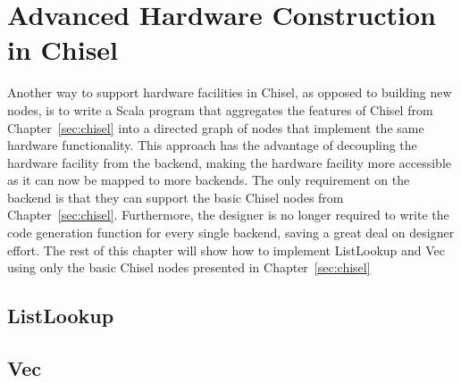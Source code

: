 \section{Advanced Hardware Construction in Chisel}
Another way to support hardware facilities in Chisel, as opposed to
building new nodes, is to write a Scala program that aggregates the
features of Chisel from Chapter~\ref{sec:chisel} into a directed graph
of nodes that implement the same hardware functionality. This approach
has the advantage of decoupling the hardware facility from the
backend, making the hardware facility more accessible as it can now be
mapped to more backends. The only requirement on the backend is that
they can support the basic Chisel nodes from
Chapter~\ref{sec:chisel}. Furthermore, the designer is no longer
required to write the code generation function for every single
backend, saving a great deal on designer effort. The rest of this
chapter will show how to implement ListLookup and Vec using only the
basic Chisel nodes presented in Chapter~\ref{sec:chisel}

\subsection{ListLookup}

\subsection{Vec}
